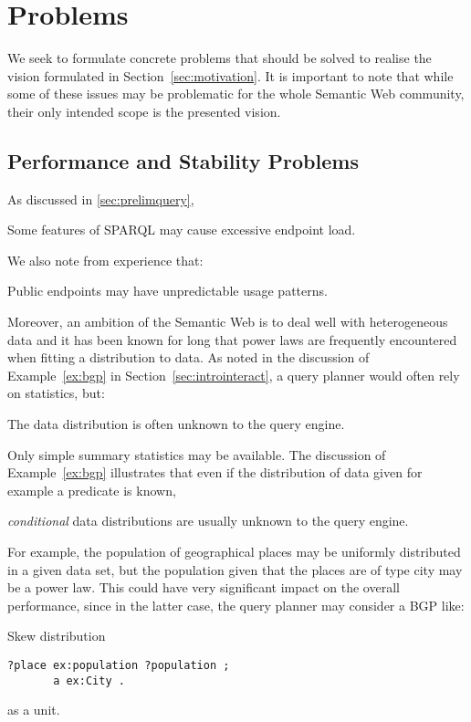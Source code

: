 \section{Problems}\label{sec:problems}

We seek to formulate concrete problems that should be solved to
realise the vision formulated in Section~\ref{sec:motivation}. It is
important to note that while some of these issues may be problematic
for the whole Semantic Web community, their only intended scope is the
presented vision.

\subsection{Performance and Stability Problems}\label{sec:perfproblems}

As discussed in \ref{sec:prelimquery}, 

\begin{problem}\label{prob:sparqlcomplex}
Some features of SPARQL may cause excessive endpoint load.
\end{problem}

We also note from experience that:

\begin{problem}\label{prob:endpointunpred}
Public endpoints may have unpredictable usage patterns.
\end{problem}

Moreover, an ambition of the Semantic Web is to deal well with
heterogeneous data and it has been known for long \cite{1385469} that
power laws are frequently encountered when fitting a distribution to
data. As noted in the discussion of Example~\ref{ex:bgp} in
Section~\ref{sec:introinteract}, a query planner would often rely on
statistics, but:

\begin{problem}\label{prob:unknowndist}
The data distribution is often unknown to the query engine.
\end{problem}
Only simple summary statistics may be available. The discussion of
Example~\ref{ex:bgp} illustrates that even if the distribution of data
given for example a predicate is known, 
\begin{problem}\label{prob:unknownconddist}
\emph{conditional} data distributions are usually unknown to the query engine.
\end{problem}
For example, the population of geographical places may be uniformly
distributed in a given data set, but the population given that the
places are of type city may be a power law. This could have very
significant impact on the overall performance, since in the latter
case, the query planner may consider a BGP like:
\begin{example}{Skew distribution}
\begin{verbatim}
?place ex:population ?population ;
       a ex:City .
\end{verbatim}
\end{example}
as a unit.



